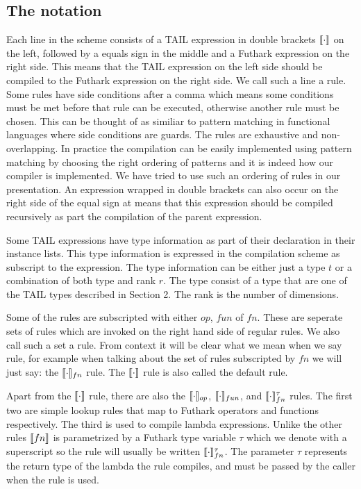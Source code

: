 \documentclass[11pt]{article}
\begin{document}
\subsection{The notation}
Each line in the scheme consists of a TAIL expression in double brackets $\llbracket \cdot \rrbracket$ on the left, followed by a
equals sign in the middle and a Futhark expression on the right side. This means that the TAIL expression on the left
side should be compiled to the Futhark expression on the right side. We call such a line a rule. Some rules have side
conditions after a comma which means some conditions must be met before that rule can be executed, otherwise another
rule must be chosen. This can be thought of as similiar to pattern matching in functional languages where side conditions
are guards. The rules are exhaustive and non-overlapping.
In practice the compilation can be easily implemented using pattern matching by choosing the right ordering of patterns
and it is indeed how our compiler is implemented.
We have tried to use such an ordering of rules in our presentation.
An expression wrapped in double brackets can also occur on the right side of the equal sign at means that this expression
should be compiled recursively as part the compilation of the parent expression.

Some TAIL expressions have type information as part of their declaration in their instance lists.
This type information is expressed in the compilation scheme as subscript to the expression.
The type information can be either just a type $t$ or a combination of both type and rank $r$.
The type consist of a type that are one of the TAIL types described in Section 2. The rank is the number of dimensions.

Some of the rules are subscripted with either $op$, $fun$ of $fn$.
These are seperate sets of rules which are invoked on the right hand side of regular rules.
We also call such a set a rule.
From context it will be clear what we mean when we say rule, for example when talking about the set of rules subscripted by
$fn$ we will just say: the $\llbracket \cdot \rrbracket_{fn}$ rule. The $\llbracket \cdot \rrbracket$ rule is also called the default rule.

Apart from the $\llbracket \cdot \rrbracket$ rule, there are also the $\llbracket \cdot \rrbracket_{op}$, $\llbracket \cdot \rrbracket_{fun}$,  and $\llbracket \cdot \rrbracket_{fn}^{\tau}$ rules.
The first two are simple lookup rules that map to Futhark operators and functions respectively.
The third is used to compile lambda expressions.
Unlike the other rules $\llbracket fn \rrbracket$ is parametrized by a Futhark type variable $\tau$ which we denote with a superscript
so the rule will usually be written $\llbracket \cdot \rrbracket_{fn}^{\tau}$.
The parameter $\tau$ represents the return type of the lambda the rule compiles,
and must be passed by the caller when the rule is used.
\end{document}

